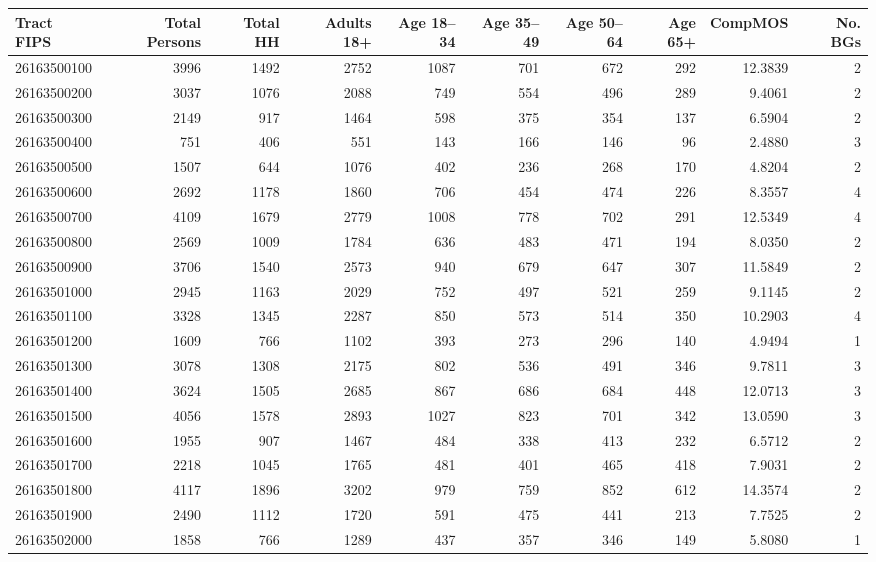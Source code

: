 \documentclass[11pt,landscape]{article}
\begin{document}
{\fontsize{7pt}{8pt}\selectfont
\begin{longtable}[]{@{}lrrrrrrrrr@{}}
\toprule
\textbf{Tract FIPS} & \textbf{Total Persons} & \textbf{Total HH} & \textbf{Adults 18+} & \textbf{Age 18--34} & \textbf{Age 35--49} & \textbf{Age 50--64} & \textbf{Age 65+} & \textbf{CompMOS} & \textbf{No. BGs} \\
\midrule
\endhead
26163500100 & 3996 & 1492 & 2752 & 1087 & 701 & 672 & 292 & 12.3839 & 2 \\
26163500200 & 3037 & 1076 & 2088 & 749 & 554 & 496 & 289 & 9.4061 & 2 \\
26163500300 & 2149 & 917 & 1464 & 598 & 375 & 354 & 137 & 6.5904 & 2 \\
26163500400 & 751 & 406 & 551 & 143 & 166 & 146 & 96 & 2.4880 & 3 \\
26163500500 & 1507 & 644 & 1076 & 402 & 236 & 268 & 170 & 4.8204 & 2 \\
26163500600 & 2692 & 1178 & 1860 & 706 & 454 & 474 & 226 & 8.3557 & 4 \\
26163500700 & 4109 & 1679 & 2779 & 1008 & 778 & 702 & 291 & 12.5349 & 4 \\
26163500800 & 2569 & 1009 & 1784 & 636 & 483 & 471 & 194 & 8.0350 & 2 \\
26163500900 & 3706 & 1540 & 2573 & 940 & 679 & 647 & 307 & 11.5849 & 2 \\
26163501000 & 2945 & 1163 & 2029 & 752 & 497 & 521 & 259 & 9.1145 & 2 \\
26163501100 & 3328 & 1345 & 2287 & 850 & 573 & 514 & 350 & 10.2903 & 4 \\
26163501200 & 1609 & 766 & 1102 & 393 & 273 & 296 & 140 & 4.9494 & 1 \\
26163501300 & 3078 & 1308 & 2175 & 802 & 536 & 491 & 346 & 9.7811 & 3 \\
26163501400 & 3624 & 1505 & 2685 & 867 & 686 & 684 & 448 & 12.0713 & 3 \\
26163501500 & 4056 & 1578 & 2893 & 1027 & 823 & 701 & 342 & 13.0590 & 3 \\
26163501600 & 1955 & 907 & 1467 & 484 & 338 & 413 & 232 & 6.5712 & 2 \\
26163501700 & 2218 & 1045 & 1765 & 481 & 401 & 465 & 418 & 7.9031 & 2 \\
26163501800 & 4117 & 1896 & 3202 & 979 & 759 & 852 & 612 & 14.3574 & 2 \\
26163501900 & 2490 & 1112 & 1720 & 591 & 475 & 441 & 213 & 7.7525 & 2 \\
26163502000 & 1858 & 766 & 1289 & 437 & 357 & 346 & 149 & 5.8080 & 1 \\

\end{longtable}}
\end{document}
